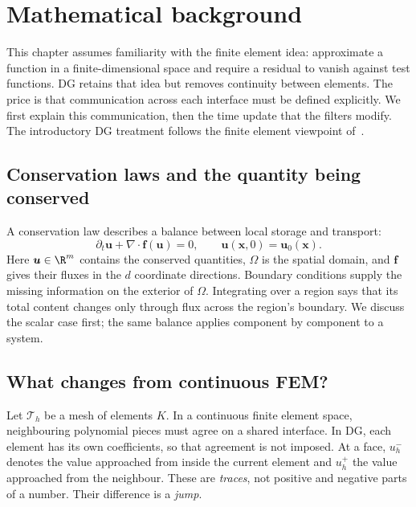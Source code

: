 \chapter{Mathematical background}
\label{chap:background}

This chapter assumes familiarity with the finite element idea: approximate a
function in a finite-dimensional space and require a residual to vanish against
test functions. DG retains that idea but removes continuity between elements.
The price is that communication across each interface must be defined explicitly.
We first explain this communication, then the time update that the filters modify. The introductory DG treatment follows the finite element viewpoint of~\cite{HesthavenWarburton2008}.

\section{Conservation laws and the quantity being conserved}
\label{sec:rkdg}
A conservation law describes a balance between local storage and transport:
\begin{equation}
 \partial_t\boldsymbol u+\nabla\cdot\boldsymbol f(\boldsymbol u)=0,
 \qquad \boldsymbol u(\boldsymbol x,0)=\boldsymbol u_0(\boldsymbol x).
 \label{eq:conservation-law}
\end{equation}
Here $\boldsymbol u\in\R^m$ contains the conserved quantities, $\Omega$ is the
spatial domain, and $\boldsymbol f$ gives their fluxes in the $d$ coordinate
directions. Boundary conditions supply the missing information on the exterior
of $\Omega$. Integrating over a region says that its total content changes only
through flux across the region's boundary. We discuss the scalar case first;
the same balance applies component by component to a system.

\section{What changes from continuous FEM?}
Let $\mathcal T_h$ be a mesh of elements $K$. In a continuous finite element
space, neighbouring polynomial pieces must agree on a shared interface. In DG,
each element has its own coefficients, so that agreement is not imposed. At a
face, $u_h^-$ denotes the value approached from inside the current element and
$u_h^+$ the value approached from the neighbour. These are \emph{traces}, not
positive and negative parts of a number. Their difference is a \emph{jump}.

